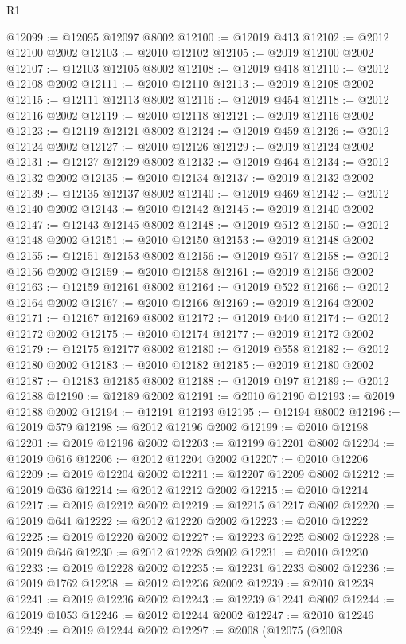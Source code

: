 \begin{lexlean}{R1}
\begin{coremodule}
@12099 := @12095 @12097 @8002
@12100 := @12019 @413
@12102 := @2012 @12100 @2002
@12103 := @2010 @12102
@12105 := @2019 @12100 @2002
@12107 := @12103 @12105 @8002
@12108 := @12019 @418
@12110 := @2012 @12108 @2002
@12111 := @2010 @12110
@12113 := @2019 @12108 @2002
@12115 := @12111 @12113 @8002
@12116 := @12019 @454
@12118 := @2012 @12116 @2002
@12119 := @2010 @12118
@12121 := @2019 @12116 @2002
@12123 := @12119 @12121 @8002
@12124 := @12019 @459
@12126 := @2012 @12124 @2002
@12127 := @2010 @12126
@12129 := @2019 @12124 @2002
@12131 := @12127 @12129 @8002
@12132 := @12019 @464
@12134 := @2012 @12132 @2002
@12135 := @2010 @12134
@12137 := @2019 @12132 @2002
@12139 := @12135 @12137 @8002
@12140 := @12019 @469
@12142 := @2012 @12140 @2002
@12143 := @2010 @12142
@12145 := @2019 @12140 @2002
@12147 := @12143 @12145 @8002
@12148 := @12019 @512
@12150 := @2012 @12148 @2002
@12151 := @2010 @12150
@12153 := @2019 @12148 @2002
@12155 := @12151 @12153 @8002
@12156 := @12019 @517
@12158 := @2012 @12156 @2002
@12159 := @2010 @12158
@12161 := @2019 @12156 @2002
@12163 := @12159 @12161 @8002
@12164 := @12019 @522
@12166 := @2012 @12164 @2002
@12167 := @2010 @12166
@12169 := @2019 @12164 @2002
@12171 := @12167 @12169 @8002
@12172 := @12019 @440
@12174 := @2012 @12172 @2002
@12175 := @2010 @12174
@12177 := @2019 @12172 @2002
@12179 := @12175 @12177 @8002
@12180 := @12019 @558
@12182 := @2012 @12180 @2002
@12183 := @2010 @12182
@12185 := @2019 @12180 @2002
@12187 := @12183 @12185 @8002
@12188 := @12019 @197
@12189 := @2012 @12188
@12190 := @12189 @2002
@12191 := @2010 @12190
@12193 := @2019 @12188 @2002
@12194 := @12191 @12193
@12195 := @12194 @8002
@12196 := @12019 @579
@12198 := @2012 @12196 @2002
@12199 := @2010 @12198
@12201 := @2019 @12196 @2002
@12203 := @12199 @12201 @8002
@12204 := @12019 @616
@12206 := @2012 @12204 @2002
@12207 := @2010 @12206
@12209 := @2019 @12204 @2002
@12211 := @12207 @12209 @8002
@12212 := @12019 @636
@12214 := @2012 @12212 @2002
@12215 := @2010 @12214
@12217 := @2019 @12212 @2002
@12219 := @12215 @12217 @8002
@12220 := @12019 @641
@12222 := @2012 @12220 @2002
@12223 := @2010 @12222
@12225 := @2019 @12220 @2002
@12227 := @12223 @12225 @8002
@12228 := @12019 @646
@12230 := @2012 @12228 @2002
@12231 := @2010 @12230
@12233 := @2019 @12228 @2002
@12235 := @12231 @12233 @8002
@12236 := @12019 @1762
@12238 := @2012 @12236 @2002
@12239 := @2010 @12238
@12241 := @2019 @12236 @2002
@12243 := @12239 @12241 @8002
@12244 := @12019 @1053
@12246 := @2012 @12244 @2002
@12247 := @2010 @12246
@12249 := @2019 @12244 @2002
@12297 := @2008
    (@12075
      (@2008

\end{coremodule}
\end{lexlean}
